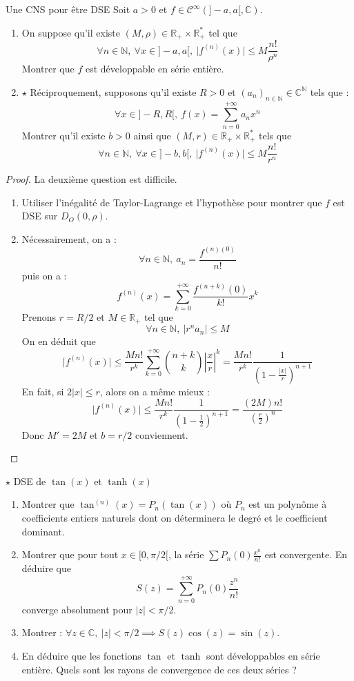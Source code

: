 \documentclass[french,a4paper]{article}
\newcommand{\N}{\mathbb{N}}
\newcommand{\R}{\mathbb{R}}
\newcommand{\C}{\mathbb{C}}
\newcommand{\st}{^*}
\theoremstyle{plain}
\theoremstyle{definition}
\theoremstyle{remark}
\begin{document}
\begin{ex}[Moulin.SE.42]{Une CNS pour être DSE}
	Soit $a>0$ et $f\in\mathcal{C}^\infty(]-a,a[,\C)$. 
	\begin{enumerate}
		\item On suppose qu'il existe $(M,\rho)\in\R_+\times\R_+\st$ tel que $$\forall n\in\N,\ \forall x\in]-a,a[,\ \lvert f^{(n)}(x)\rvert\leqslant M\frac{n!}{\rho^n}$$ Montrer que $f$ est développable en série entière.
		\item $\star$ Réciproquement, supposons qu'il existe $R>0$ et $(a_n)_{n\in\N}\in\C^\N$ tels que : $$\forall x\in]-R,R[,\ f(x)=\sum_{n=0}^{+\infty}a_nx^n$$ Montrer qu'il existe $b>0$ ainsi que $(M,r)\in\R_+\times\R_+\st$ tels que $$\forall n\in\N,\ \forall x\in]-b,b[,\ \lvert f^{(n)}(x)\rvert\leqslant M\frac{n!}{r^n}$$
	\end{enumerate}
\end{ex}
\begin{proof}
	La deuxième question est difficile.
	\begin{enumerate}
		\item Utiliser l'inégalité de Taylor-Lagrange et l'hypothèse pour montrer que $f$ est DSE sur $D_O(0,\rho)$.
		\item Nécessairement, on a : $$\forall n\in\N,\ a_n=\frac{f^{(n)(0)}}{n!}$$ puis on a : $$f^{(n)}(x)=\sum_{k=0}^{+\infty}\frac{f^{(n+k)}(0)}{k!}x^k$$ Prenons $r=R/2$ et $M\in\R_+$ tel que $$\forall n\in\N,\ \lvert r^na_n\rvert\leqslant M$$ On en déduit que $$\lvert f^{(n)}(x)\rvert\leqslant\frac{Mn!}{r^k}\sum_{k=0}^{+\infty}\binom{n+k}{k}\left\lvert\frac{x}{r}\right\rvert^k=\frac{Mn!}{r^k}\frac{1}{\left(1-\frac{\lvert x\rvert}{r}\right)^{n+1}}$$ En fait, si $2\lvert x\rvert\leqslant r$, alors on a même mieux : $$\lvert f^{(n)}(x)\rvert\leqslant\frac{Mn!}{r^k}\frac{1}{\left(1-\frac{1}{2}\right)^{n+1}}=\frac{(2M)n!}{\left(\frac{r}{2}\right)^n}$$ Donc $M'=2M$ et $b=r/2$ conviennent.
	\end{enumerate}
\end{proof}

\begin{ex}[Moulin.SE.43]{$\star$ DSE de $\tan(x)$ et $\tanh(x)$}
	\begin{enumerate}
		\item Montrer que $\tan^{(n)}(x)=P_n(\tan(x))$ où $P_n$ est un polynôme à coefficients entiers naturels dont on déterminera le degré et le coefficient dominant.
		\item Montrer que pour tout $x\in[0,\pi/2[$, la série $\displaystyle\sum P_n(0)\frac{x^n}{n!}$ est convergente. En déduire que $$S(z)=\sum_{n=0}^{+\infty}P_n(0)\frac{z^n}{n!}$$ converge absolument pour $\lvert z\rvert<\pi/2$.
		\item Montrer : $\forall z\in\C,\ \lvert z\rvert<\pi/2\implies S(z)\cos(z)=\sin(z)$.
		\item En déduire que les fonctions $\tan$ et $\tanh$ sont développables en série entière. Quels sont les rayons de convergence de ces deux séries ?
	\end{enumerate}
\end{ex}
\end{document}
